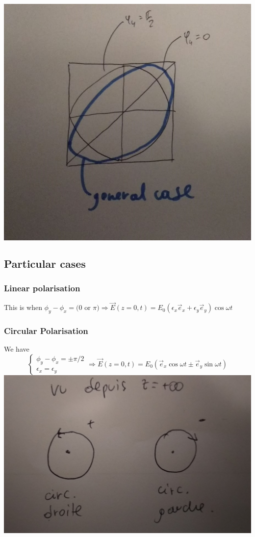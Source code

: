 \documentclass[10pt,a4paper]{book}
\begin{document}
\includegraphics[scale=0.2]{fig1}
\subsection{Particular cases}
\subsubsection{Linear polarisation}
This is when $\phi_y-\phi_x=(0$ or $\pi)\Rightarrow \vec{E}(z=0,t)=E_0(\epsilon_x\vec{e}_x+\epsilon_y\vec{e}_y)\cos\omega t$
\subsubsection{Circular Polarisation}
We have
$$\begin{cases}
\phi_y-\phi_x=\pm\pi/2\\
\epsilon_x=\epsilon_y
\end{cases}\Rightarrow \vec{E}(z=0,t)=E_0(\vec{e}_x\cos\omega t\pm\vec{e}_y\sin\omega t)$$
\includegraphics[scale=0.05]{fig2}
\end{document}
